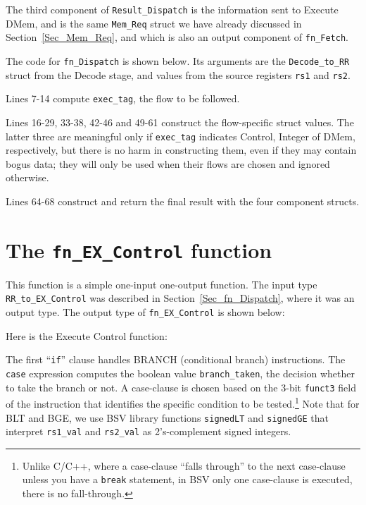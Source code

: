 The third component of \verb|Result_Dispatch| is the information sent
to Execute DMem, and is the same \verb|Mem_Req| struct we have already
discussed in Section~\ref{Sec_Mem_Req}, and which is also an output
component of \verb|fn_Fetch|.

The code for \verb|fn_Dispatch| is shown below.  Its arguments are the
\verb|Decode_to_RR| struct from the Decode stage, and values from the
source registers \verb|rs1| and \verb|rs2|.



Lines 7-14 compute \verb|exec_tag|, {\ie} the flow to be followed.

Lines 16-29, 33-38, 42-46 and 49-61 construct the flow-specific struct
values.  The latter three are meaningful only if \verb|exec_tag|
indicates Control, Integer of DMem, respectively, but there is no harm
in constructing them, even if they may contain bogus data; they will
only be used when their flows are chosen and ignored otherwise.

Lines 64-68 construct and return the final result with the four
component structs.


\section{The {\tt fn\_EX\_Control} function}

\label{Sec_fn_EX_Control}


This function is a simple one-input one-output function.  The input
type \verb|RR_to_EX_Control| was described in
Section~\ref{Sec_fn_Dispatch}, where it was an output type.  The
output type of \verb|fn_EX_Control| is shown below:



Here is the Execute Control function:



The first ``\verb|if|'' clause handles BRANCH (conditional branch)
instructions.  The \verb|case| expression computes the boolean value
\verb|branch_taken|, {\ie} the decision whether to take the branch or
not.  A case-clause is chosen based on the 3-bit \verb|funct3| field
of the instruction that identifies the specific condition to be
tested.\footnote{Unlike C/C++, where a case-clause ``falls through''
to the next case-clause unless you have a {\tt break} statement, in
BSV only one case-clause is executed, there is no fall-through.}  Note
that for BLT and BGE, we use BSV library functions \verb|signedLT| and
\verb|signedGE| that interpret \verb|rs1_val| and \verb|rs2_val| as
2's-complement signed integers.

